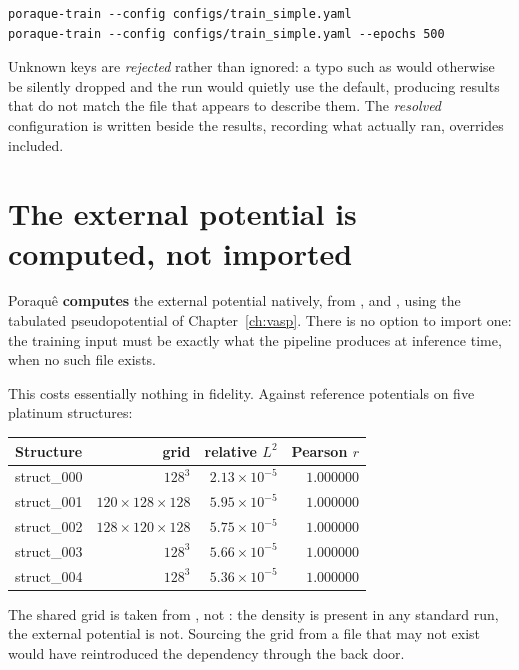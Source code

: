 \begin{lstlisting}
poraque-train --config configs/train_simple.yaml
poraque-train --config configs/train_simple.yaml --epochs 500
\end{lstlisting}

Unknown keys are \emph{rejected} rather than ignored: a typo such as
 would otherwise be silently dropped and the run would quietly
use the default, producing results that do not match the file that appears to
describe them. The \emph{resolved} configuration is written beside the results,
recording what actually ran, overrides included.

\section{The external potential is computed, not imported}
\label{sec:computedextcar}

Poraqu\^e \textbf{computes} the external potential natively, from
,  and , using the tabulated
pseudopotential of Chapter~\ref{ch:vasp}. There is no option to import one:
the training input must be exactly what the pipeline produces at inference
time, when no such file exists.

This costs essentially nothing in fidelity. Against reference potentials on
five platinum structures:

\begin{center}
\begin{tabular}{@{}lrrr@{}}
\toprule
Structure & grid & relative $L^2$ & Pearson $r$ \\
\midrule
struct\_000 & $128^3$ & $2.13\times10^{-5}$ & $1.000000$ \\
struct\_001 & $120{\times}128{\times}128$ & $5.95\times10^{-5}$ & $1.000000$ \\
struct\_002 & $128{\times}120{\times}128$ & $5.75\times10^{-5}$ & $1.000000$ \\
struct\_003 & $128^3$ & $5.66\times10^{-5}$ & $1.000000$ \\
struct\_004 & $128^3$ & $5.36\times10^{-5}$ & $1.000000$ \\
\bottomrule
\end{tabular}
\end{center}

\begin{ptip}
The shared grid is taken from , not : the density is
present in any standard run, the external potential is not. Sourcing the grid
from a file that may not exist would have reintroduced the dependency through
the back door.
\end{ptip}

